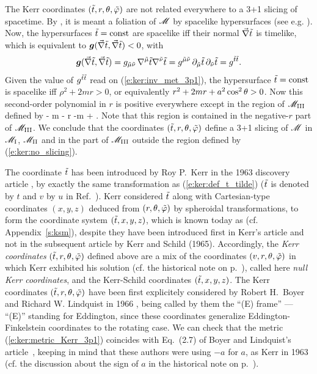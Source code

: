 \begin{remark} \label{r:ker:Kerr_slicing}
The Kerr coordinates
$({\tilde t},r,\theta,{\tilde\varphi})$ are not related everywhere to a 3+1 slicing of
spacetime. By , it is meant a foliation of $\mathscr{M}$
by spacelike hypersurfaces (see e.g. \cite{Gourg12}). Now, the hypersurfaces
${\tilde t} = \mathrm{const}$ are spacelike iff their normal $\vec{\nabla} {\tilde t}$ is timelike, which
is equivalent to $\bm{g}(\vec{\nabla} {\tilde t}, \vec{\nabla} {\tilde t}) < 0$, with
\[
    \bm{g}(\vec{\nabla} {\tilde t}, \vec{\nabla} {\tilde t}) = g_{\tilde{\mu}\tilde{\nu}} \, \nabla^{\tilde{\mu}} {\tilde t} \nabla^{\tilde{\nu}} {\tilde t}
    = g^{\tilde{\mu}\tilde{\nu}}\,  \partial_{\tilde{\mu}} {\tilde t} \, \partial_{\tilde{\nu}} {\tilde t} = g^{{\tilde t}{\tilde t}} .
\]
Given the value of $g^{{\tilde t}{\tilde t}}$ read on (\ref{e:ker:inv_met_3p1}), the hypersurface
${\tilde t}=\mathrm{const}$ is spacelike iff $\rho^2+2mr > 0$, or equivalently
$r^2 + 2 mr + a^2\cos^2\theta > 0$. Now this second-order polynomial in $r$
is positive everywhere except in the region of $\mathscr{M}_{\rm III}$ defined by
\be \label{e:ker:no_slicing}
    - m -  \leq r \leq -m +  .
\ee
Note that this region is contained in the negative-$r$ part of $\mathscr{M}_{\rm III}$.
We conclude that the coordinates $({\tilde t},r,\theta,{\tilde\varphi})$ define a 3+1 slicing of $\mathscr{M}$
in $\mathscr{M}_{\rm I}$, $\mathscr{M}_{\rm II}$ and in the part of $\mathscr{M}_{\rm III}$ outside the
region defined by (\ref{e:ker:no_slicing}).
\end{remark}

\begin{hist}
The coordinate ${\tilde t}$ has been introduced by Roy P.~Kerr
in the 1963 discovery article \cite{Kerr63}, by exactly
the same transformation as (\ref{e:ker:def_t_tilde}) (${\tilde t}$ is denoted by $t$
and $v$ by $u$ in Ref.~\cite{Kerr63}).
Kerr considered ${\tilde t}$ along with Cartesian-type coordinates $(x,y,z)$
deduced from $(r,\theta,{\tilde\varphi})$ by spheroidal transformations, to form the
coordinate system $({\tilde t},x,y,z)$, which is known today as
 (cf. Appendix~\ref{s:ksm}),
despite
they have been introduced first in Kerr's article \cite{Kerr63} and not
in the subsequent article by Kerr and Schild \cite{KerrS65} (1965). Accordingly,
the \emph{Kerr coordinates} $({\tilde t}, r, \theta,{\tilde\varphi})$ defined above
are a mix of the coordinates
$(v,r,\theta,{\tilde\varphi})$ in which Kerr exhibited his solution
(cf. the historical note on p.~\pageref{h:ker:Kerr_coord}), called here
\emph{null Kerr coordinates},
and the Kerr-Schild coordinates $({\tilde t},x,y,z)$.
The Kerr coordinates $({\tilde t}, r, \theta,{\tilde\varphi})$ have been first explicitely
considered by Robert H.~Boyer and Richard W. Lindquist
in 1966 \cite{BoyerL67}, being called by them the ``(E) frame'' --- ``(E)'' standing
for Eddington, since these coordinates generalize
Eddington-Finkelstein coordinates to the rotating case.
We can check that the metric (\ref{e:ker:metric_Kerr_3p1}) coincides
with Eq.~(2.7) of Boyer and Lindquist's article~\cite{BoyerL67},
keeping in mind that these authors were using $-a$ for $a$, as Kerr in 1963
(cf. the discussion about the sign of $a$ in
the historical note on p.~\pageref{h:ker:Kerr_coord}).
\end{hist}



